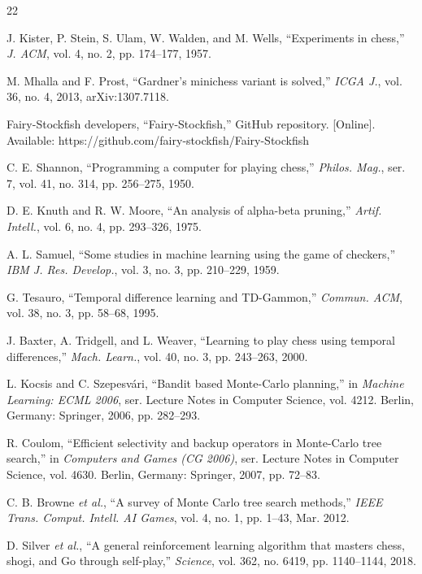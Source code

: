 \begin{thebibliography}{22}

J. Kister, P. Stein, S. Ulam, W. Walden, and M. Wells, ``Experiments in chess,'' \emph{J. ACM}, vol. 4, no. 2, pp. 174--177, 1957.

M. Mhalla and F. Prost, ``Gardner's minichess variant is solved,'' \emph{ICGA J.}, vol. 36, no. 4, 2013, arXiv:1307.7118.

Fairy-Stockfish developers, ``Fairy-Stockfish,'' GitHub repository. [Online]. Available: https://github.com/fairy-stockfish/Fairy-Stockfish

C. E. Shannon, ``Programming a computer for playing chess,'' \emph{Philos. Mag.}, ser. 7, vol. 41, no. 314, pp. 256--275, 1950.

D. E. Knuth and R. W. Moore, ``An analysis of alpha-beta pruning,'' \emph{Artif. Intell.}, vol. 6, no. 4, pp. 293--326, 1975.

A. L. Samuel, ``Some studies in machine learning using the game of checkers,'' \emph{IBM J. Res. Develop.}, vol. 3, no. 3, pp. 210--229, 1959.

G. Tesauro, ``Temporal difference learning and TD-Gammon,'' \emph{Commun. ACM}, vol. 38, no. 3, pp. 58--68, 1995.

J. Baxter, A. Tridgell, and L. Weaver, ``Learning to play chess using temporal differences,'' \emph{Mach. Learn.}, vol. 40, no. 3, pp. 243--263, 2000.

L. Kocsis and C. Szepesv\'ari, ``Bandit based Monte-Carlo planning,'' in \emph{Machine Learning: ECML 2006}, ser. Lecture Notes in Computer Science, vol. 4212. Berlin, Germany: Springer, 2006, pp. 282--293.

R. Coulom, ``Efficient selectivity and backup operators in Monte-Carlo tree search,'' in \emph{Computers and Games (CG 2006)}, ser. Lecture Notes in Computer Science, vol. 4630. Berlin, Germany: Springer, 2007, pp. 72--83.

C. B. Browne \emph{et al.}, ``A survey of Monte Carlo tree search methods,'' \emph{IEEE Trans. Comput. Intell. AI Games}, vol. 4, no. 1, pp. 1--43, Mar. 2012.

D. Silver \emph{et al.}, ``A general reinforcement learning algorithm that masters chess, shogi, and Go through self-play,'' \emph{Science}, vol. 362, no. 6419, pp. 1140--1144, 2018.


\end{thebibliography}
